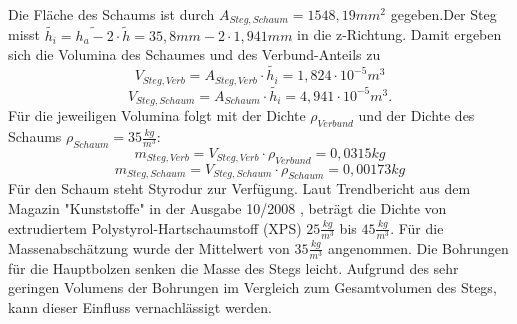 Die Fläche des Schaums ist durch $ A_{Steg,Schaum}=1548,19mm^{2} $ gegeben.Der Steg misst $ \tilde{h_{i}}=\tilde{h_{a}-2}\cdot\tilde{h}=35,8mm-2\cdot1,941mm $ in die z-Richtung. Damit ergeben sich die Volumina des Schaumes und des Verbund-Anteils zu
\begin{equation}
	V_{Steg,Verb}=A_{Steg,Verb}\cdot\tilde{h_{i}}=1,824\cdot10^{-5}m^{3}
\end{equation}
\begin{equation}
	V_{Steg,Schaum}=A_{Schaum}\cdot\tilde{h_{i}}=4,941\cdot10^{-5}m^{3}.
\end{equation}
Für die jeweiligen Volumina folgt mit der Dichte $ \rho_{Verbund} $ und der Dichte des Schaums $ \rho_{Schaum}=35\frac{kg}{m^{3}} $:
\begin{equation}
	m_{Steg,Verb}=V_{Steg,Verb}\cdot\rho_{Verbund}=0,0315kg
\end{equation}
\begin{equation}
		m_{Steg,Schaum}=V_{Steg,Schaum}\cdot\rho_{Schaum}=0,00173kg
\end{equation}
Für den Schaum steht Styrodur zur Verfügung. Laut Trendbericht aus dem Magazin "Kunststoffe" in der Ausgabe 10/2008 \cite{item7}, beträgt die Dichte von extrudiertem Polystyrol-Hartschaumstoff (XPS) $ 25\frac{kg}{m^{3}} $ bis $ 45\frac{kg}{m^{3}} $. Für die Massenabschätzung wurde der Mittelwert von $ 35\frac{kg}{m^{3}} $ angenommen. Die Bohrungen für die Hauptbolzen senken die Masse des Stegs leicht. Aufgrund des sehr geringen Volumens der Bohrungen im Vergleich zum Gesamtvolumen des Stegs, kann dieser Einfluss vernachlässigt werden. 

